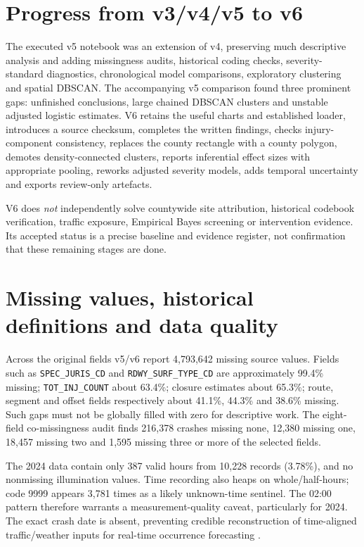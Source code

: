 \documentclass[11pt,a4paper,openany]{report}
\newcommand{\pathcode}[1]{\nolinkurl{#1}}
\begin{document}
\section{Progress from v3/v4/v5 to v6}
The executed v5 notebook was an extension of v4, preserving much descriptive analysis and adding missingness audits, historical coding checks, severity-standard diagnostics, chronological model comparisons, exploratory clustering and spatial DBSCAN. The accompanying v5 comparison found three prominent gaps: unfinished conclusions, large chained DBSCAN clusters and unstable adjusted logistic estimates. V6 retains the useful charts and established loader, introduces a source checksum, completes the written findings, checks injury-component consistency, replaces the county rectangle with a county polygon, demotes density-connected clusters, reports inferential effect sizes with appropriate pooling, reworks adjusted severity models, adds temporal uncertainty and exports review-only artefacts.

V6 does \emph{not} independently solve countywide site attribution, historical codebook verification, traffic exposure, Empirical Bayes screening or intervention evidence. Its accepted status is a precise baseline and evidence register, not confirmation that these remaining stages are done.

\section{Missing values, historical definitions and data quality}
Across the original fields v5/v6 report 4,793,642 missing source values. Fields such as \pathcode{SPEC_JURIS_CD} and \pathcode{RDWY_SURF_TYPE_CD} are approximately 99.4\% missing; \pathcode{TOT_INJ_COUNT} about 63.4\%; closure estimates about 65.3\%; route, segment and offset fields respectively about 41.1\%, 44.3\% and 38.6\% missing. Such gaps must not be globally filled with zero for descriptive work. The eight-field co-missingness audit finds 216,378 crashes missing none, 12,380 missing one, 18,457 missing two and 1,595 missing three or more of the selected fields.

The 2024 data contain only 387 valid hours from 10,228 records (3.78\%), and no nonmissing illumination values. Time recording also heaps on whole/half-hours; code 9999 appears 3,781 times as a likely unknown-time sentinel. The 02:00 pattern therefore warrants a measurement-quality caveat, particularly for 2024. The exact crash date is absent, preventing credible reconstruction of time-aligned traffic/weather inputs for real-time occurrence forecasting \cite{WPRDC}.
\end{document}
